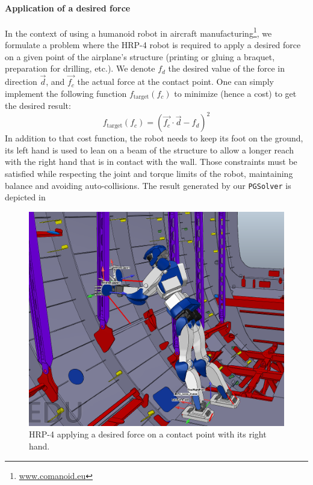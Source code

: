 \paragraph{Application of a desired force}
In the context of using a humanoid robot in aircraft manufacturing\footnote{\url{www.comanoid.eu}}, we formulate a problem where the HRP-4 robot is required to apply a desired force on a given point of the airplane's structure (printing or gluing a braquet, preparation for drilling, etc.).
We denote $f_d$ the desired value of the force in direction $\vec{d}$, and $\vec{f_c}$ the actual force at the contact point. One can simply implement the following function $f_{\text{target}}(f_c)$ to minimize (hence a cost) to get the desired result:
\begin{equation}
  f_{\text{target}}(f_c) = {\left(\vec{f_c}\cdot\vec{d}-f_d\right)}^2
\end{equation}
In addition to that cost function, the robot needs to keep its foot on the ground, its left hand is used to lean on a beam of the structure to allow a longer reach with the right hand that is in contact with the wall.
Those constraints must be satisfied while respecting the joint and torque limits of the robot, maintaining balance and avoiding auto-collisions.
The result generated by our {\tt PGSolver} is depicted in~
\begin{figure}
  \centering
  \includegraphics[width=0.6\linewidth]{comanoid.png}
  \caption{HRP-4 applying a desired force on a contact point with its right hand.}
\label{fig:comanoid}
\end{figure}

